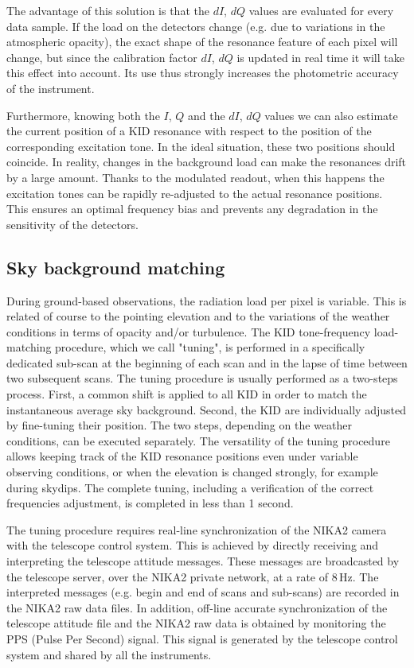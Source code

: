 \documentclass[]{aa} %
\begin{document}
The advantage of this solution is that the $dI$, $dQ$ values are evaluated for every data sample. If the load on the detectors change (e.g. due to variations in the atmospheric opacity), the exact shape of the resonance feature of each pixel will change, but since the calibration factor $dI$, $dQ$ is updated in real time it will take this effect into account. Its use thus strongly increases the photometric accuracy of the instrument.

Furthermore, knowing both the $I$, $Q$ and the $dI$, $dQ$ values we can also estimate the current position of a KID resonance with respect to the position of the corresponding excitation tone. In the ideal situation, these two positions should coincide. In reality, changes in the background load can make the resonances drift by a large amount. Thanks to the modulated readout, when this happens the excitation tones can be rapidly re-adjusted to the actual resonance positions. This ensures an optimal frequency bias and prevents any degradation in the sensitivity of the detectors.

\subsection{Sky background matching}
\label{Sky background matching}

During ground-based observations, the radiation load per pixel is variable. This is related of course to the pointing elevation and to the variations of the weather conditions in terms of opacity and/or turbulence. The KID tone-frequency load-matching procedure, which we call "tuning", is performed in a specifically dedicated sub-scan at the beginning of each scan and in the lapse of time between two subsequent scans. The tuning procedure is usually performed as a two-steps process. First, a common shift is applied to all KID in order to match the instantaneous average sky background. Second, the KID are individually adjusted by fine-tuning their position. The two steps, depending on the weather conditions, can be executed separately. The versatility of the tuning procedure allows keeping track of the KID resonance positions even under variable observing conditions, or when the elevation is changed strongly, for example during skydips. The complete tuning, including a verification of the correct frequencies adjustment, is completed in less than 1 second. 

The tuning procedure requires real-line synchronization of the NIKA2 camera with the telescope control system. This is achieved by directly receiving and interpreting the telescope attitude messages. These messages are broadcasted by the telescope server, over the NIKA2 private network, at a rate of 8\,Hz. The interpreted messages (e.g. begin and end of scans and sub-scans) are recorded in the NIKA2 raw data files. In addition, off-line accurate synchronization of the telescope attitude file and the NIKA2 raw data is obtained by monitoring the PPS (Pulse Per Second) signal. This signal is generated by the telescope control system and shared by all the instruments.
\end{document}
